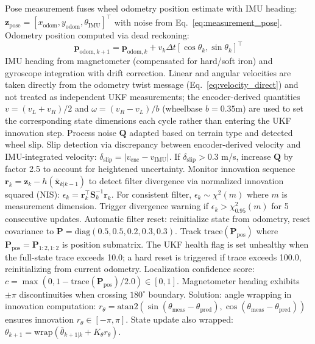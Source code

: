 \documentclass[pdflatex,sn-nature]{sn-jnl}%
\begin{document}
Pose measurement fuses wheel odometry position estimate with IMU heading: $\mathbf{z}_{\text{pose}} = [x_{\text{odom}}, y_{\text{odom}}, \theta_{\text{IMU}}]^\top$ with noise from Eq.~\ref{eq:measurement_pose}. Odometry position computed via dead reckoning:
\begin{equation}
\mathbf{p}_{\text{odom}, k+1} = \mathbf{p}_{\text{odom}, k} + v_k \Delta t [\cos\theta_k, \sin\theta_k]^\top
\label{eq:odometry_deadreckoning}
\end{equation}
IMU heading from magnetometer (compensated for hard/soft iron) and gyroscope integration with drift correction. Linear and angular velocities are taken directly from the odometry twist message (Eq.~\ref{eq:velocity_direct}) and not treated as independent UKF measurements; the encoder-derived quantities $v = (v_L + v_R)/2$ and $\omega = (v_R - v_L)/b$ (wheelbase $b=0.35$m) are used to set the corresponding state dimensions each cycle rather than entering the UKF innovation step. Process noise $\mathbf{Q}$ adapted based on terrain type and detected wheel slip. Slip detection via discrepancy between encoder-derived velocity and IMU-integrated velocity: $\delta_{\text{slip}} = |v_{\text{enc}} - v_{\text{IMU}}|$. If $\delta_{\text{slip}} > 0.3$ m/s, increase $\mathbf{Q}$ by factor 2.5 to account for heightened uncertainty. Monitor innovation sequence $\mathbf{r}_k = \mathbf{z}_k - h(\bar{\mathbf{x}}_{k|k-1})$ to detect filter divergence via normalized innovation squared (NIS): $\epsilon_k = \mathbf{r}_k^\top \mathbf{S}_k^{-1} \mathbf{r}_k$. For consistent filter, $\epsilon_k \sim \chi^2(m)$ where $m$ is measurement dimension. Trigger divergence warning if $\epsilon_k > \chi^2_{0.95}(m)$ for 5 consecutive updates. Automatic filter reset: reinitialize state from odometry, reset covariance to $\mathbf{P} = \text{diag}(0.5, 0.5, 0.2, 0.3, 0.3)$. Track $\text{trace}(\mathbf{P}_{\text{pos}})$ where $\mathbf{P}_{\text{pos}} = \mathbf{P}_{1:2,1:2}$ is position submatrix. The UKF health flag is set unhealthy when the full-state trace exceeds 10.0; a hard reset is triggered if trace exceeds 100.0, reinitializing from current odometry. Localization confidence score: $c = \max(0, 1 - \text{trace}(\mathbf{P}_{\text{pos}})/2.0) \in [0,1]$. Magnetometer heading exhibits $\pm\pi$ discontinuities when crossing $180^{\circ}$ boundary. Solution: angle wrapping in innovation computation: $r_\theta = \text{atan2}(\sin(\theta_{\text{meas}} - \theta_{\text{pred}}), \cos(\theta_{\text{meas}} - \theta_{\text{pred}}))$ ensures innovation $r_\theta \in [-\pi, \pi]$. State update also wrapped: $\theta_{k+1} = \text{wrap}(\bar{\theta}_{k+1|k} + K_\theta r_\theta)$.
\end{document}
